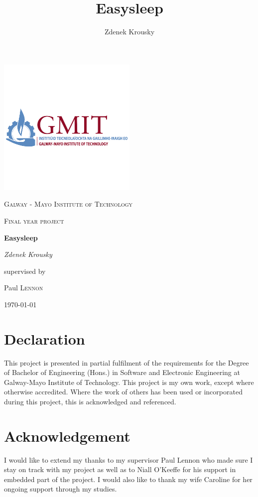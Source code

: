 \documentclass[12pt,a4paper]{article}
\author{Zdenek Krousky}
\title{Easysleep}
\begin{document}
	\begin{titlepage}
		\centering
		\includegraphics[width=0.5\textwidth]{gmit_full1.png}\par\vspace{0cm}
		{\scshape\LARGE Galway - Mayo Institute of Technology \par}
		\vspace{1cm}
		{\scshape\Large Final year project\par}
		\vspace{1.5cm}
		{\huge\bfseries Easysleep\par}
		\vspace{2cm}
		{\Large\itshape Zdenek Krousky\par}
		\vfill
		supervised by\par
		Paul \textsc{Lennon}
		
		\vfill
		
		{\large \today\par}
	\end{titlepage}
	
	\newpage
	\newpage
	
	\section*{Declaration}
	This project is presented in partial fulfilment of the requirements for the Degree of Bachelor of Engineering (Hons.) in Software and Electronic Engineering at Galway-Mayo Institute of Technology. This project is my own work, except where otherwise accredited. Where the work of others has been used or incorporated during this project, this is acknowledged and referenced.
	\newpage
	
	\section*{Acknowledgement}
	I would like to extend my thanks to my supervisor Paul Lennon who made sure I stay on track with my project as well as to Niall O'Keeffe for his support in embedded part of the project. I would also like to thank my wife Caroline for her ongoing support through my studies.
	\newpage
	\tableofcontents
	\newpage
	
\end{document}
